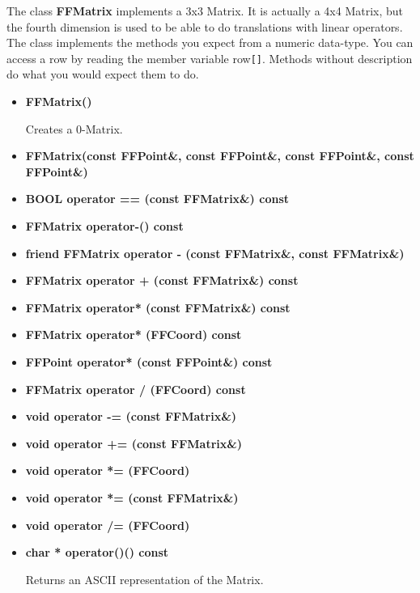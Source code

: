 The class {\bf FFMatrix} implements a 3x3 Matrix. It is actually a 4x4
Matrix, but the fourth dimension is used to be able to do translations
with linear operators. The class implements the methods you expect
from a numeric data-type. You can access a row by reading
the member variable row\verb|[]|. Methods without description do what
you would expect them to do.

\begin{itemize}

\item{\bf FFMatrix()}

Creates a 0-Matrix.

\item{\bf FFMatrix(const FFPoint\&, const FFPoint\&, 
        const FFPoint\&, const FFPoint\&)}
    
\item{\bf BOOL operator == (const FFMatrix\&) const}

\item{\bf FFMatrix operator-() const}
\item{\bf friend FFMatrix operator - (const FFMatrix\&, const 
        FFMatrix\&)}

\item{\bf FFMatrix operator + (const FFMatrix\&) const}
\item{\bf FFMatrix operator* (const FFMatrix\&) const}
\item{\bf FFMatrix operator* (FFCoord) const}
\item{\bf FFPoint operator* (const FFPoint\&) const}
\item{\bf FFMatrix operator / (FFCoord) const}

\item{\bf void operator -= (const FFMatrix\&)}
\item{\bf void operator += (const FFMatrix\&)}
\item{\bf void operator *= (FFCoord)}
\item{\bf void operator *= (const FFMatrix\&)}
\item{\bf void operator /= (FFCoord)}

\item{\bf char * operator()() const}

Returns an ASCII representation of the Matrix.

\end{itemize}
